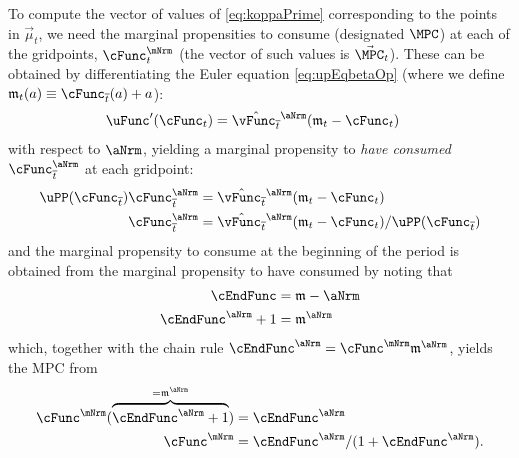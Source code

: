 \documentclass[titlepage, headings=optiontotocandhead]{\econtex}
\begin{document}
To compute the vector of values of \eqref{eq:koppaPrime} corresponding
to the points in $\vec{\mu}_{t}$, we need the marginal propensities to
consume (designated $\MPC$) at each of the gridpoints,
$\cFunc^{\mNrm}_{t}$ (the vector of such values is 
$\vec{\MPC}_{t}$).  These can be obtained by differentiating the
Euler equation \eqref{eq:upEqbetaOp} (where we define
$\mathfrak{m}_{t}({a}) \equiv \cEOPt({a})+{a}$):
\begin{equation}\begin{gathered}\begin{aligned}
      \uFunc^{\prime}({\cFunc}_{t})   & = \hat{\vEOPt}^{\aNrm}(\mathfrak{m}_{t}-{\cFunc}_{t})
    \end{aligned}\end{gathered}\end{equation}
with respect to $\aNrm$, yielding a marginal propensity to
\textit{have consumed} $\cFunc_{\overline{t}}^{\aNrm}$ at each gridpoint:
\begin{equation}\begin{gathered}\begin{aligned}
      \uPP(\cEOPt)\cEOPt^{\aNrm}  & = \hat{\vEOPt}^{\aNrm}(\mathfrak{m}_{t}-{\cFunc}_{t})
      \\ \cEOPt^{\aNrm}  & = \hat{\vEOPt}^{\aNrm}(\mathfrak{m}_{t}-{\cFunc}_{t})/\uPP(\cEOPt)
    \end{aligned}\end{gathered}\end{equation}
and the marginal propensity to consume at the beginning of the period is obtained from the marginal
propensity to have consumed by noting that
\begin{equation*}\begin{gathered}\begin{aligned}
      \cEndFunc  & = \mathfrak{m}-\aNrm
      \\ \cEndFunc^{\aNrm}+1  & = \mathfrak{m}^{\aNrm}
    \end{aligned}\end{gathered}\end{equation*}
which, together with the chain rule $\cEndFunc^{\aNrm}  = \cFunc^{\mNrm}\mathfrak{m}^{\aNrm}$,
yields the MPC from
\begin{equation}\begin{gathered}\begin{aligned}
      \cFunc^{\mNrm}(\overbrace{\cEndFunc^{\aNrm}+1}^{=\mathfrak{m}^{\aNrm}})  & = \cEndFunc^{\aNrm}
      \\ \cFunc^{\mNrm}  & = \cEndFunc^{\aNrm}/(1+\cEndFunc^{\aNrm}) \label{eq:MPCfromMPTHC}.
    \end{aligned}\end{gathered}\end{equation}
\end{document}
